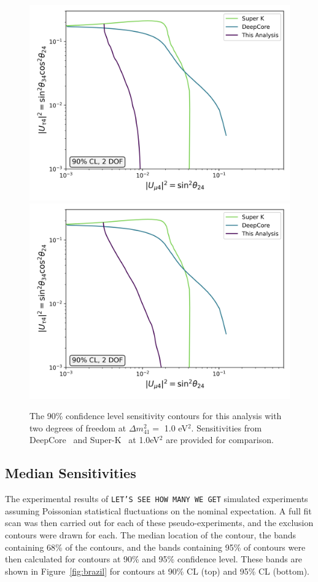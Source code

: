 \documentclass[main.tex]{subfiles}
\begin{document}
\begin{figure}
    \centering
    \includegraphics[width=0.45\linewidth]{figures/comparison.png}%
    \includegraphics[width=0.45\linewidth]{figures/comparison_updated.png}
    \caption{The 90\% confidence level sensitivity contours for this analysis with two degrees of freedom at $\Delta m_{41}^{2}=$ 1.0 eV$^{2}$. Sensitivities from DeepCore~\cite{Aartsen_2017_dc} and Super-K~\cite{PhysRevD.91.052019} at 1.0eV$^{2}$ are provided for comparison.}\label{fig:experiment_compare}
\end{figure}


\subsection{Median Sensitivities}

The experimental results of \texttt{LET'S SEE HOW MANY WE GET} simulated experiments assuming Poissonian statistical fluctuations on the nominal expectation.
A full fit scan was then carried out for each of these pseudo-experiments, and the exclusion contours were drawn for each.
The median location of the contour, the bands containing 68\% of the contours, and the bands containing 95\% of contours were then calculated for contours at 90\% and 95\% confidence level. 
These bands are shown in Figure~\ref{fig:brazil} for contours at 90\% CL (top) and 95\% CL (bottom).
\end{document}
